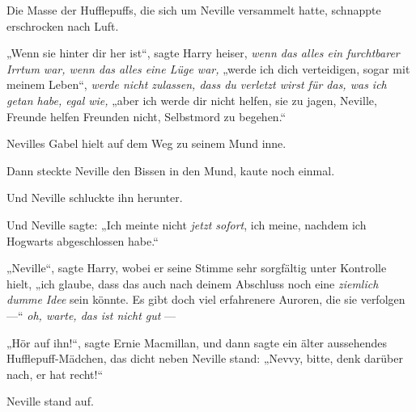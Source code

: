 Die Masse der Hufflepuffs, die sich um Neville versammelt hatte, schnappte erschrocken nach Luft.

„Wenn sie hinter dir her ist“, sagte Harry heiser, \emph{wenn das alles ein furchtbarer Irrtum war, wenn das alles eine Lüge war,} „werde ich dich verteidigen, sogar mit meinem Leben“, \emph{werde nicht zulassen, dass du verletzt wirst für das, was ich getan habe, egal wie,} „aber ich werde dir nicht helfen, sie zu jagen, Neville, Freunde helfen Freunden nicht, Selbstmord zu begehen.“

Nevilles Gabel hielt auf dem Weg zu seinem Mund inne.

Dann steckte Neville den Bissen in den Mund, kaute noch einmal.

Und Neville schluckte ihn herunter.

Und Neville sagte:
„Ich meinte nicht \emph{jetzt sofort}, ich meine, nachdem ich Hogwarts abgeschlossen habe.“

„Neville“, sagte Harry, wobei er seine Stimme sehr sorgfältig unter Kontrolle hielt, „ich glaube, dass das auch nach deinem Abschluss noch eine \emph{ziemlich dumme} \emph{Idee} sein könnte. Es gibt doch viel erfahrenere Auroren, die sie verfolgen —“ \emph{oh, warte, das ist nicht gut} —

„Hör auf ihn!“, sagte Ernie Macmillan, und dann sagte ein älter aussehendes Hufflepuff-Mädchen, das dicht neben Neville stand:
„Nevvy, bitte, denk darüber nach, er hat recht!“

Neville stand auf.


